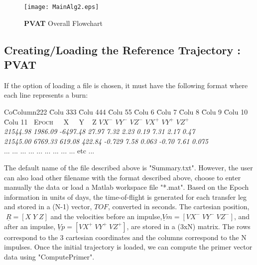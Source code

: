 \documentclass[12pt]{report}
\begin{document}
\begin{figure}
\centering
\texttt{[image: MainAlg2.eps]}
\caption{\textbf{PVAT} Overall Flowchart} \label{main}
\end{figure}


\subsection{Creating/Loading the Reference Trajectory : PVAT}

If the option of loading a file is chosen, it must have the
following format where each line represents a burn:
\begin{tabbing}
Co\= Column222 \= Colu 333  \= Colu 444  \= Colu 55  \= Colu 6 \=
Colu 7 \= Colu 8  \= Colu 9  \= Colu 10  \= Colu 11  \kill \>
\textsc{$\;\;$Epoch} \> \textsc{$\;\;\;$ X} \>
\textsc{$\;\;\;\;$Y} \> \textsc{$\;\;\;$Z} \> \textsc{$VX^{-}$} \>
\textsc{$VY^{-}$} \> \textsc{$VZ^{-}$} \> \textsc{$VX^{+}$} \>
\textsc{$VY^{+}$}
\> \textsc{$VZ^{+}$} \\
 \> \textit{21544.98} \> \textit{1986.09} \>
\textit{-6497.48} \> \textit{27.97} \> \textit{7.32} \>
\textit{2.23} \> \textit{0.19} \> \textit{7.31} \> \textit{2.17}
\> \textit{0.47} \\
\> \textit{21545.00} \> \textit{6769.33} \> \textit{619.08} \>
\textit{422.84} \> \textit{-0.729} \> \textit{7.58} \>
\textit{0.063} \> \textit{-0.70} \> \textit{7.61}
\> \textit{0.075}\\
 \> ... \> ... \> ... \> ... \> ... \> ... \> ... \> ... \> ...
\> etc ...\\
\end{tabbing}
\noindent The default name of the file described above is
"Summary.txt". However, the user can also load other filename with
the format described above, choose to enter manually the data or
load a Matlab workspace file "*.mat". Based on the Epoch
information in units of days, the time-of-flight is generated for
each transfer leg and stored in a (N-1) vector, $TOF$, converted
in seconds. The cartesian position,$\;\underline{R} = [ X \; Y \;Z
]$ and the velocities before an impulse,$\underline{V}m = [ VX^{-}
\; VY^{-} \; VZ^{-}]$, and after an impulse,$\; \underline{V}p= [
VX^{+} \; VY^{+} \; VZ^{+}]$, are stored in a (3xN) matrix. The
rows correspond to the 3 cartesian coordinates and the columns
correspond to the N impulses. Once the initial trajectory is
loaded, we can compute the primer vector data using
"ComputePrimer".
\end{document}
